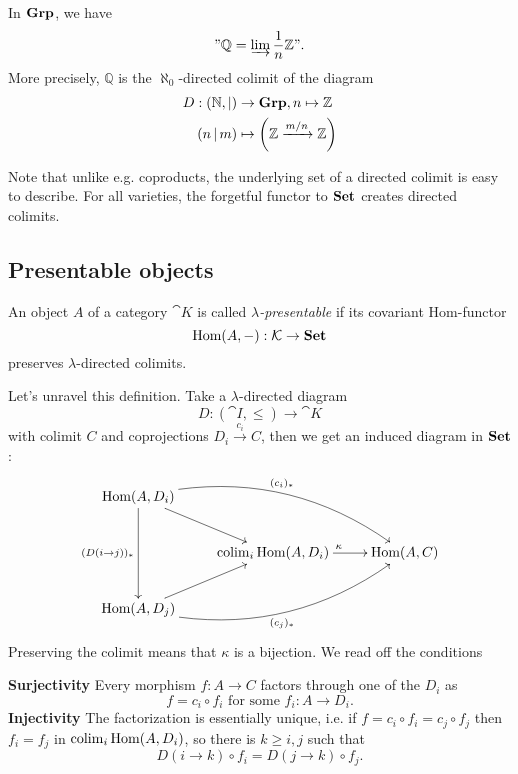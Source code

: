 \begin{Example}\label{ex:Q}
In $\mathbf{Grp}$, we have 
\[ "\mathbb Q = \varinjlim \frac 1 n \mathbb Z". \]
More precisely, $\mathbb Q$ is the $\aleph_0$-directed colimit of the diagram
\begin{align*}
 D : (\mathbb N, |) &\to \mathbf{Grp}, n \mapsto \mathbb Z \\
 (n\, | \,m) &\mapsto \left(\mathbb Z \xrightarrow{m/n} \mathbb Z\right)
\end{align*}
\end{Example}

Note that unlike e.g. coproducts, the underlying set of a directed colimit is easy to describe. For all varieties, the forgetful functor to $\mathbf{Set}$ creates directed colimits.

\subsection{Presentable objects}
\begin{Definition}
An object $A$ of a category $\cat K$ is called \emph{$\lambda$-presentable} if its covariant Hom-functor 
\[ \textrm{Hom}(A,-) : \mathcal{K} \to \mathbf{Set} \]
preserves $\lambda$-directed colimits.
\end{Definition}
Let's unravel this definition. Take a $\lambda$-directed diagram
\[ D : (\cat I,\leq) \to \cat K \]
with colimit $C$ and coprojections $D_i \xrightarrow{c_i} C$, then we get an induced diagram in $\mathbf{Set}$:
\[
\xymatrix{
\hom(A,D_i) \ar[rd] \ar[dd]_{(D(i \to j))_*} \ar@/^2pc/[rrd]^{(c_i)_*} \\
& \colim_i \hom(A,D_i) \ar[r]^{\kappa} & \hom(A,C) \\
\hom(A,D_j) \ar[ru] \ar@/_2pc/[rru]_{(c_j)_*} \\
}\]
Preserving the colimit means that $\kappa$ is a bijection. We read off the conditions

\textbf{Surjectivity} Every morphism $f : A \to C$ factors through one of the $D_i$ as
\begin{equation}
f = c_i \circ f_i \text { for some } f_i : A \to D_i.
\end{equation}
\textbf{Injectivity} The factorization is essentially unique, i.e. if $f = c_i\circ  f_i = c_j\circ  f_j$ then $f_i = f_j$ in $\operatorname{colim}_i \textrm{Hom}(A,D_i)$, so there is $k \geq i,j$ such that
\begin{equation}
D(i \to k) \circ f_i = D(j \to k) \circ f_j.
\end{equation}

